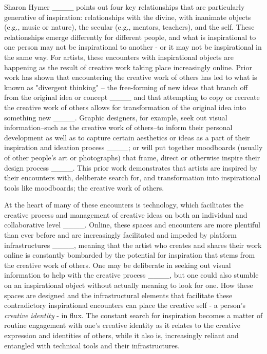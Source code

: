     Sharon Hymer ____ points out four key relationships that are particularly generative of inspiration: relationships with the divine, with inanimate objects (e.g., music or nature), the secular (e.g., mentors, teachers), and the self. These relationships emerge differently for different people, and what is inspirational to one person may not be inspirational to another - or it may not be inspirational in the same way. For artists, these encounters with inspirational objects are happening as the result of creative work taking place increasingly online. Prior work has shown that encountering the creative work of others has led to what is known as "divergent thinking" -- the free-forming of new ideas that branch off from the original idea or concept ____ and that attempting to copy or recreate the creative work of others allows for transformation of the original idea into something new ____. Graphic designers, for example, seek out visual information--such as the creative work of others--to inform their personal development as well as to capture certain aesthetics or ideas as a part of their inspiration and ideation process ____; or will put together moodboards (usually of other people's art or photographs) that frame, direct or otherwise inspire their design process ____. This prior work demonstrates that artists are inspired by their encounters with, deliberate search for, and transformation into inspirational tools like moodboards; the creative work of others.\par

    At the heart of many of these encounters is technology, which facilitates the creative process and management of creative ideas on both an individual and collaborative level ____. Online, these spaces and encounters are more plentiful than ever before and are increasingly facilitated and impeded by platform infrastructures ____, meaning that the artist who creates and shares their work online is constantly bombarded by the potential for inspiration that stems from the creative work of others. One may be deliberate in seeking out visual information to help with the creative process ____, but one could also stumble on an inspirational object without actually meaning to look for one. How these spaces are designed and the infrastructural elements that facilitate these contradictory inspirational encounters can place the creative self - a person's \textit{creative identity} - in flux. The constant search for inspiration becomes a matter of routine engagement with one's creative identity as it relates to the creative expression and identities of others, while it also is, increasingly reliant and entangled with technical tools and their infrastructures. 

